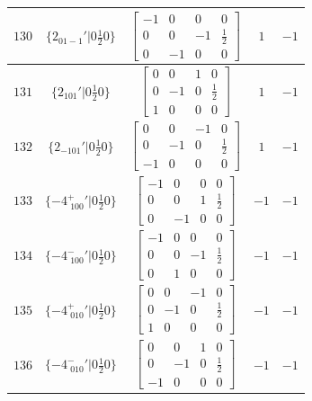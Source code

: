 \documentclass[fleqn,8pt]{jsarticle}
\begin{document}
\begin{longtable}{ccccc}
$ 130 $ & $ \{2{}_{01-1}{}'|0 \frac{1}{2} 0\} $ & $ \begin{bmatrix} -1 & 0 & 0 & 0 \\ 0 & 0 & -1 & \frac{1}{2} \\ 0 & -1 & 0 & 0 \end{bmatrix} $ & $ 1 $ & $ -1 $ \\ \hline
$ 131 $ & $ \{2{}_{101}{}'|0 \frac{1}{2} 0\} $ & $ \begin{bmatrix} 0 & 0 & 1 & 0 \\ 0 & -1 & 0 & \frac{1}{2} \\ 1 & 0 & 0 & 0 \end{bmatrix} $ & $ 1 $ & $ -1 $ \\ \hline
$ 132 $ & $ \{2{}_{-101}{}'|0 \frac{1}{2} 0\} $ & $ \begin{bmatrix} 0 & 0 & -1 & 0 \\ 0 & -1 & 0 & \frac{1}{2} \\ -1 & 0 & 0 & 0 \end{bmatrix} $ & $ 1 $ & $ -1 $ \\ \hline
$ 133 $ & $ \{-4^{+}_{\,\,100}{}'|0 \frac{1}{2} 0\} $ & $ \begin{bmatrix} -1 & 0 & 0 & 0 \\ 0 & 0 & 1 & \frac{1}{2} \\ 0 & -1 & 0 & 0 \end{bmatrix} $ & $ -1 $ & $ -1 $ \\ \hline
$ 134 $ & $ \{-4^{-}_{\,\,100}{}'|0 \frac{1}{2} 0\} $ & $ \begin{bmatrix} -1 & 0 & 0 & 0 \\ 0 & 0 & -1 & \frac{1}{2} \\ 0 & 1 & 0 & 0 \end{bmatrix} $ & $ -1 $ & $ -1 $ \\ \hline
$ 135 $ & $ \{-4^{+}_{\,\,010}{}'|0 \frac{1}{2} 0\} $ & $ \begin{bmatrix} 0 & 0 & -1 & 0 \\ 0 & -1 & 0 & \frac{1}{2} \\ 1 & 0 & 0 & 0 \end{bmatrix} $ & $ -1 $ & $ -1 $ \\ \hline
$ 136 $ & $ \{-4^{-}_{\,\,010}{}'|0 \frac{1}{2} 0\} $ & $ \begin{bmatrix} 0 & 0 & 1 & 0 \\ 0 & -1 & 0 & \frac{1}{2} \\ -1 & 0 & 0 & 0 \end{bmatrix} $ & $ -1 $ & $ -1 $ \\ \hline

\end{longtable}
\end{document}
